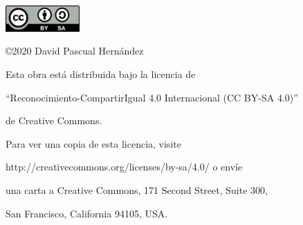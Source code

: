 \begin{flushright}
	
	\includegraphics[height=1.0cm]{figures/CC-BY-SA.png}
	
	\vspace*{0.5cm}
	
	\copyright 2020 David Pascual Hernández
	
	\vspace*{0.3cm}
	
	Esta obra está distribuida bajo la licencia de 
	
	``Reconocimiento-CompartirIgual 4.0 Internacional (CC BY-SA 4.0)''
	
	de Creative Commons.
	
	\vspace{0.2cm}
	
	Para ver una copia de esta licencia, visite
	
	http://creativecommons.org/licenses/by-sa/4.0/ o envíe
	
	una carta a Creative Commons, 171 Second Street, Suite 300,
	
	San Francisco, California 94105, USA.
	
\end{flushright}
